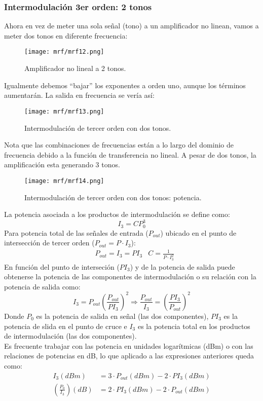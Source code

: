 \documentclass[
	12pt, %
	fleqn, %
	a4paper, %
	oneside, %
]{LegrandOrangeBook}
\begin{document}
\subsubsection{Intermodulación 3er orden: 2 tonos}
Ahora en vez de meter una sola señal (tono) a un amplificador no linean, vamos a meter dos tonos en diferente frecuencia:
\begin{figure}[H]
\centering
\texttt{[image: mrf/mrf12.png]}
\caption{Amplificador no lineal a 2 tonos.}
\end{figure}
Igualmente debemos ``bajar'' los exponentes a orden uno, aunque los términos aumentarán. La salida en frecuencia se vería así:
\begin{figure}[H]
\centering
\texttt{[image: mrf/mrf13.png]}
\caption{Intermodulación de tercer orden con dos tonos.}
\end{figure}
Nota que las combinaciones de frecuencias están a lo largo del dominio de frecuencia debido a la función de transferencia no lineal. A pesar de dos tonos, la amplificación esta generando 3 tonos.
\begin{figure}[H]
\centering
\texttt{[image: mrf/mrf14.png]}
\caption{Intermodulación de tercer orden con dos tonos: potencia.}
\end{figure}
La potencia asociada a los productos de intermodulación se define como:
\begin{equation}
I_3=CP_0^3
\end{equation}
Para potencia total de las señales de entrada ($P_{out}$) ubicado en el punto de intersección de tercer orden ($P_{out}=P\cdot I_3$):
\begin{align*}
&P_{out}=I_3=PI_3 &C=\frac{1}{P\cdot I_3^2}
\end{align*}
En función del punto de interseción ($PI_3$) y de la potencia de salida puede obtenerse la potencia de las componentes de intermodulación o su relación con la potencia de salida como:
\begin{equation}
I_3=P_{out}\left(\frac{P_{out}}{PI_3}\right)^2 \Rightarrow \frac{P_{out}}{I_3}=\left(\frac{PI_3}{P_{out}}\right)^2
\end{equation}
Donde $P_0$ es la potencia de salida en señal (las dos componentes), $PI_3$ es la potencia de slida en el punto de cruce e $I_3$ es la potencia total en los productos de intermodulación (las dos componentes).\\
Es frecuente trabajar con las potencia en unidades logarítmicas (dBm) o con las relaciones de potencias en dB, lo que aplicado a las expresiones anteriores queda como:
\begin{align}
I_3(dBm)&=3\cdot P_{out}(dBm)-2\cdot PI_3(dBm)\\
\left(\frac{P_0}{I_3}\right)(dB)&=2\cdot PI_3(dBm)-2\cdot P_{out}(dBm)
\end{align}
\end{document}
